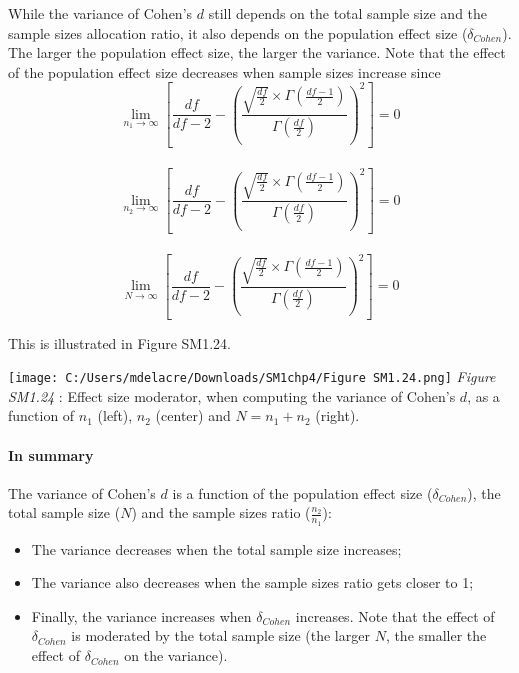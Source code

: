 \documentclass[
  english,
  man,mask,floatsintext]{apa6}
\providecommand{\tightlist}{%
  \setlength{\itemsep}{0pt}\setlength{\parskip}{0pt}}
\let\oldparagraph\paragraph
\renewcommand{\paragraph}[1]{\oldparagraph{#1}\mbox{}}
\begin{document}
While the variance of Cohen's \(d\) still depends on the total sample size and the sample sizes allocation ratio, it also depends on the population effect size (\(\delta_{Cohen}\)). The larger the population effect size, the larger the variance. Note that the effect of the population effect size decreases when sample sizes increase since
\[\lim_{n_1\rightarrow \infty}\left[\frac{df}{df-2} - \left( \frac{\sqrt{\frac{df}{2}} \times \Gamma \left(\frac{df-1}{2} \right)}{\Gamma \left( \frac{df}{2}\right)}\right)^2 \right]=0\]\\
\[\lim_{n_2\rightarrow \infty}\left[\frac{df}{df-2} - \left( \frac{\sqrt{\frac{df}{2}} \times \Gamma \left(\frac{df-1}{2} \right)}{\Gamma \left( \frac{df}{2}\right)}\right)^2 \right]=0\]\\
\[\lim_{N\rightarrow \infty}\left[\frac{df}{df-2} - \left( \frac{\sqrt{\frac{df}{2}} \times \Gamma \left(\frac{df-1}{2} \right)}{\Gamma \left( \frac{df}{2}\right)}\right)^2 \right]=0\]

This is illustrated in Figure SM1.24.

\texttt{[image: C:/Users/mdelacre/Downloads/SM1chp4/Figure SM1.24.png]}
\emph{Figure SM1.24} : Effect size moderator, when computing the variance of Cohen's \(d\), as a function of \(n_1\) (left), \(n_2\) (center) and \(N=n_1+n_2\) (right).

\hypertarget{in-summary-1}{%
\paragraph{In summary}\label{in-summary-1}}

The variance of Cohen's \(d\) is a function of the population effect size (\(\delta_{Cohen}\)), the total sample size (\(N\)) and the sample sizes ratio (\(\frac{n_2}{n_1}\)):

\begin{itemize}
\tightlist
\item
  The variance decreases when the total sample size increases;\\
\item
  The variance also decreases when the sample sizes ratio gets closer to 1;\\
\item
  Finally, the variance increases when \(\delta_{Cohen}\) increases. Note that the effect of \(\delta_{Cohen}\) is moderated by the total sample size (the larger \(N\), the smaller the effect of \(\delta_{Cohen}\) on the variance).
\end{itemize}
\end{document}

